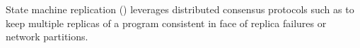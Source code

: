 State machine replication (\smr) leverages distributed consensus protocols
such as \paxos to keep multiple replicas of a program consistent in face
of replica failures or network partitions.
